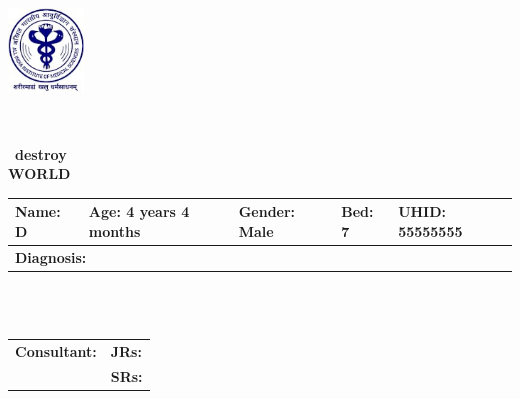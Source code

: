 \documentclass{article}
\begin{document}
\
\noindent
\begin{minipage}{0.2\textwidth} %
    \includegraphics[width=2cm]{RESOURCES/AIIMS_LOGO.png} %
\end{minipage}\
\vspace{-1cm} %
\hfill
\fontsize{9pt}{11pt}\selectfont %
\begin{center}\
    \textbf{destroy} \\
    \textbf{WORLD} \\
\end{center}
\fontsize{10pt}{12pt}\selectfont %
\noindent\begin{tabular}{|p{5cm}|p{4cm}|p{2.5cm}|p{1.5cm}|p{3cm}|}
    \hline
    \textbf{Name:} D & \textbf{Age:} 4 years 4 months & \textbf{Gender:} Male & \textbf{Bed:} 7 & \textbf{UHID:} 55555555 \\
    \hline
    \multicolumn{5}{|p{19cm}|}{\textbf{Diagnosis:}  }\\
    \hline
\end{tabular}
\\
\\
\noindent\begin{tabular}{|p{11.3cm}|p{7.3cm}|}
     \hline
    \textbf{Consultant:}       & \textbf{JRs:}  \\
    \cline{2-2}
      & \textbf{SRs:}  \\
    \hline
\end{tabular}
\vspace{0.1cm} %
\noindent
\end{document}
